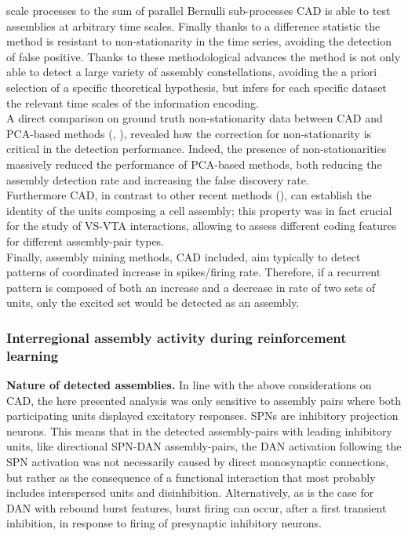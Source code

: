 scale processes to the sum of parallel Bernulli sub-processes CAD is able to test assemblies at arbitrary time scales. Finally thanks to a difference statistic the method is resistant to non-stationarity in the time series, avoiding the detection of false positive. Thanks to these methodological advances the method is not only able to detect a large variety of assembly constellations, avoiding the a priori selection of a specific theoretical hypothesis, but infers for each specific dataset the relevant time scales of the information encoding.\\A direct comparison on ground truth non-stationarity data between CAD and PCA-based methods (\cite{Lopes}, \cite{RussoDurstewitz}), revealed how the correction for non-stationarity is critical in the detection performance. Indeed, the presence of non-stationarities massively reduced the performance of PCA-based methods, both reducing the assembly detection rate and increasing the false discovery rate.\\Furthermore CAD, in contrast to other recent methods (\cite{Watanabe2019}), can establish the identity of the units composing a cell assembly; this property was in fact crucial for the study of VS-VTA interactions, allowing to assess different coding features for different assembly-pair types.\\
Finally, assembly mining methods, CAD included, aim typically to detect patterns of coordinated increase in spikes/firing rate. Therefore, if a recurrent pattern is composed of both an increase and a decrease in rate of two sets of units, only the excited set would be detected as an assembly. 

\subsubsection{Interregional assembly activity during reinforcement learning}
\textbf{Nature of detected assemblies.} In line with the above considerations on CAD, the here presented analysis was only sensitive to assembly pairs where both participating units displayed excitatory responses. SPNs are inhibitory projection neurons. This means that in the detected assembly-pairs with leading inhibitory units, like directional SPN-DAN assembly-pairs, the DAN activation following the SPN activation was not necessarily caused by direct monosynaptic connections, but rather as the consequence of a functional interaction that most probably includes interspersed units and disinhibition. Alternatively, as is the case for DAN with rebound burst features, burst firing can occur, after a first transient inhibition, in response to firing of presynaptic inhibitory neurons. 

